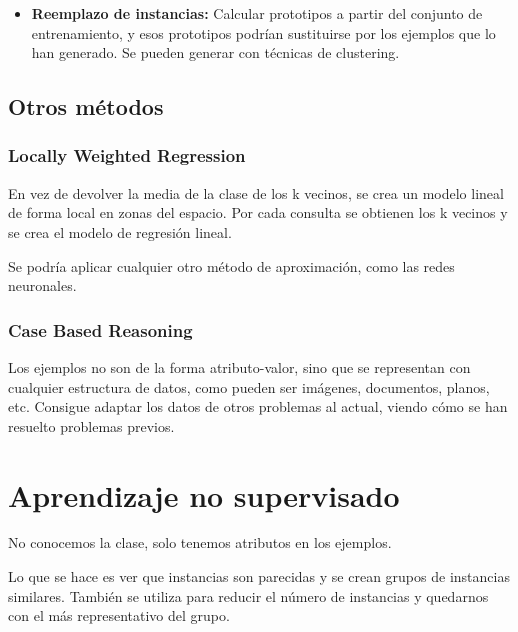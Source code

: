 \documentclass[12pt, twoside, openright]{report} %
\begin{document}
\begin{itemize}
\begin{itemize}
		      \item \textbf{Reemplazo de instancias:} Calcular prototipos a partir del conjunto de entrenamiento, y esos prototipos podrían sustituirse por los ejemplos que lo han generado. Se pueden generar con técnicas de clustering.
	      \end{itemize}

\end{itemize}
\subsection{Otros métodos}
\subsubsection{Locally Weighted Regression}
En vez de devolver la media de la clase de los k vecinos, se crea un modelo lineal de forma local en zonas del espacio. Por cada consulta se obtienen los k vecinos y se crea el modelo de regresión lineal.

Se podría aplicar cualquier otro método de aproximación, como las redes neuronales.
\subsubsection{Case Based Reasoning}
Los ejemplos no son de la forma atributo-valor, sino que se representan con cualquier estructura de datos, como pueden ser imágenes, documentos, planos, etc. Consigue adaptar los datos de otros problemas al actual, viendo cómo se han resuelto problemas previos.

\section{Aprendizaje no supervisado}
No conocemos la clase, solo tenemos atributos en los ejemplos.

Lo que se hace es ver que instancias son parecidas y se crean grupos de instancias similares. También se utiliza para reducir el número de instancias y quedarnos con el más representativo del grupo.
\end{document}

